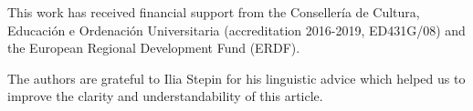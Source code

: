 \documentclass[11pt]{article}
\begin{document}
 This work has received financial support from the Conseller\'{i}a de Cultura, Educaci\'{o}n e Ordenaci\'{o}n Universitaria (accreditation 2016-2019, ED431G/08) and the European Regional Development Fund (ERDF). 

The authors are grateful to  Ilia Stepin for his linguistic advice which helped us to improve the clarity and understandability of this article.

\newpage











%
%
%
%
%
%
%
%
%
%
%
%
%
%
%
%
%
\end{document}
